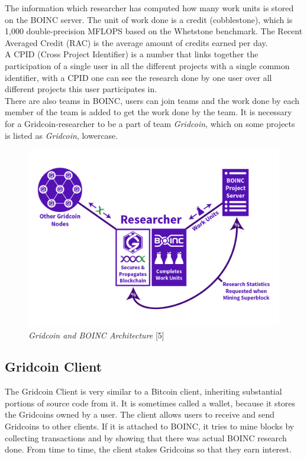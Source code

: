The information which researcher has computed how many work units is stored on the BOINC server. The unit of work done is a credit (cobblestone), which is 1,000 double-precision MFLOPS based on the Whetstone benchmark.  The Recent Averaged Credit (RAC) is the average amount of credits earned per day.\\

A CPID (Cross Project Identifier) is a number that links together the participation of a single user in all the different projects with a single common identifier, with a CPID one can see the research done by one user over all different projects this user participates in.\\

There are also teams in BOINC, users can join teams and the work done by each member of the team is added to get the work done by the team. It is necessary for a Gridcoin-researcher to be a part of team \textit{Gridcoin}, which on some projects is listed as \textit{Gridcoin}, lowercase.

\begin{figure}
\centering
\includegraphics[scale=0.5]{figures/researcherdiagram_joshoeah}
\medskip
\caption{\textit{Gridcoin and BOINC Architecture} [5]}
\small
\end{figure}

\subsection{Gridcoin Client}

The Gridcoin Client is very similar to a Bitcoin client, inheriting substantial portions of source code from it. It is sometimes called a wallet, because it stores the Gridcoins owned by a user. The client allows users to receive and send Gridcoins to other clients. If it is attached to BOINC, it tries to mine blocks by collecting transactions and by showing that there was actual BOINC research done. From time to time, the client stakes Gridcoins so that they earn interest.

